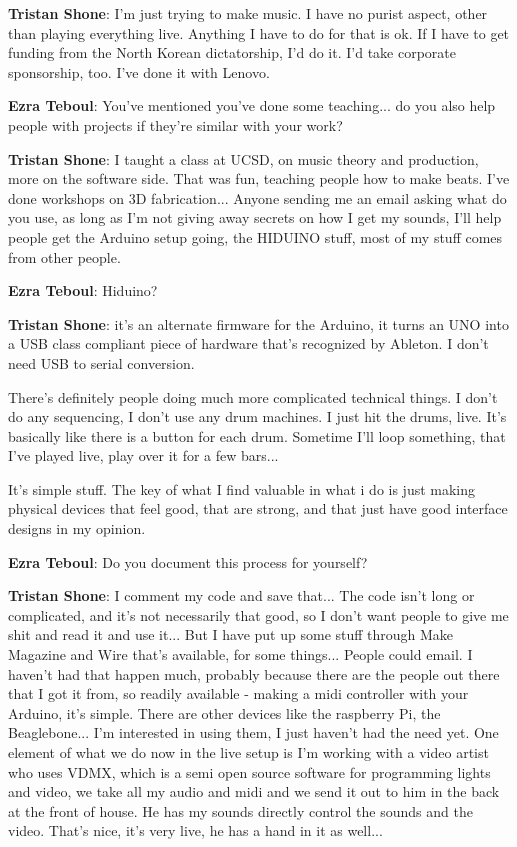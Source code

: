 \textbf{Tristan Shone}: I'm just trying to make music. I have no purist aspect, other than playing everything live. Anything I have to do for that is ok. If I have to get funding from the North Korean dictatorship, I'd do it. I'd take corporate sponsorship, too. I've done it with Lenovo. 

\textbf{Ezra Teboul}: You've mentioned you've done some teaching... do you also help people with projects if they're similar with your work? 

\textbf{Tristan Shone}: I taught a class at UCSD, on music theory and production, more on the software side. That was fun, teaching people how to make beats. I've done workshops on 3D fabrication... Anyone sending me an email asking what do you use, as long as I'm not giving away secrets on how I get my sounds, I'll help people get the Arduino setup going, the HIDUINO stuff, most of my stuff comes from other people. 

\textbf{Ezra Teboul}: Hiduino? 

\textbf{Tristan Shone}: it's an alternate firmware for the Arduino, it turns an UNO into a USB class compliant piece of hardware that's recognized by Ableton. I don't need USB to serial conversion. 

There's definitely people doing much more complicated technical things. I don't do any sequencing, I don't use any drum machines. I just hit the drums, live. It's basically like there is a button for each drum. Sometime I'll loop something, that I've played live, play over it for a few bars... 

It's simple stuff. The key of what I find valuable in what i do is just making physical devices that feel good, that are strong, and that just have good interface designs in my opinion. 

\textbf{Ezra Teboul}: Do you document this process for yourself? 

\textbf{Tristan Shone}: I comment my code and save that... The code isn't long or complicated, and it's not necessarily that good, so I don't want people to give me shit and read it and use it... But I have put up some stuff through Make Magazine and Wire that's available, for some things... People could email. I haven't had that happen much, probably because there are the people out there that I got it from, so readily available - making a midi controller with your Arduino, it's simple. There are other devices like the raspberry Pi, the Beaglebone... I'm interested in using them, I just haven't had the need yet. One element of what we do now in the live setup is I'm working with a video artist who uses VDMX, which is a semi open source software for programming lights and video, we take all my audio and midi and we send it out to him in the back at the front of house. He has my sounds directly control the sounds and the video. That's nice, it's very live, he has a hand in it as well... 

